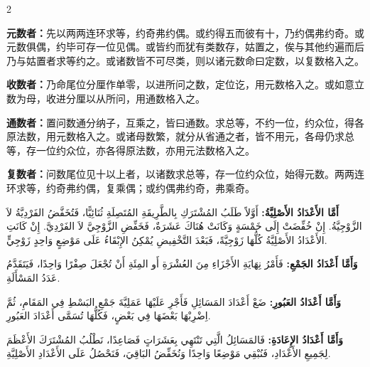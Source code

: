 \documentclass[11pt,a4paper]{article}
\newcommand{\ar}[1]{\arabicfont\beginR #1\endR}
\newcommand{\zhtext}[1]{{\chinese #1}}
\newenvironment{bilingual}{%
  \begin{paracol}{2}
}{%
  \end{paracol}
}
\begin{document}
\begin{bilingual}

\begin{leftcolumn*}
\textbf{元数者：}\zhtext{先以两两连环求等，约奇弗约偶。或约得五而彼有十，乃约偶弗约奇。或元数俱偶，约毕可存一位见偶。或皆约而犹有类数存，姑置之，俟与其他约遍而后乃与姑置者求等约之。或诸数皆不可尽类，则以诸元数命曰定数，以复数格入之。}

\textbf{收数者：}\zhtext{乃命尾位分厘作单零，以进所问之数，定位讫，用元数格入之。或如意立数为母，收进分厘以从所问，用通数格入之。}

\textbf{通数者：}\zhtext{置问数通分纳子，互乘之，皆曰通数。求总等，不约一位，约众位，得各原法数，用元数格入之。或诸母数繁，就分从省通之者，皆不用元，各母仍求总等，存一位约众位，亦各得原法数，亦用元法数格入之。}

\textbf{复数者：}\zhtext{问数尾位见十以上者，以诸数求总等，存一位约众位，始得元数。两两连环求等，约奇弗约偶，复乘偶；或约偶弗约奇，弗乘奇。}
\end{leftcolumn*}

\begin{rightcolumn*}
\ar{\textbf{أَمَّا الأَعْدَادُ الأَصْلِيَّةُ:} أَوَّلاً طَلَبُ المُشْتَرَكِ بِالطَّرِيقَةِ المُتَصِلَةِ ثُنَائِيًّا، فَتُخَفَّضُ الفَرْدِيَّةُ لاَ الزَّوْجِيَّةُ. إِنْ خُفِّضَتْ إِلَى خَمْسَةٍ وَكَانَتْ هُنَاكَ عَشَرَةٌ، فَخَفِّضِ الزَّوْجِيَّ لاَ الفَرْدِيَّ. إِنْ كَانَتِ الأَعْدَادُ الأَصْلِيَّةُ كُلُّهَا زَوْجِيَّةً، فَبَعْدَ التَّخْفِيضِ يُمْكِنُ الإِبْقَاءُ عَلَى مَوْضِعٍ وَاحِدٍ زَوْجِيٍّ.}

\ar{\textbf{وَأَمَّا أَعْدَادُ الجَمْعِ:} فَأَمْرُ نِهَايَةِ الأَجْزَاءِ مِنَ العُشْرَةِ أَو المِئَةِ أَنْ تُجْعَلَ صِفْرًا وَاحِدًا، فَيَتَقَدَّمُ عَدَدُ المَسْأَلَةِ.}

\ar{\textbf{وَأَمَّا أَعْدَادُ العَبُورِ:} ضَعْ أَعْدَادَ المَسَائِلِ فَأَجْرِ عَلَيْهَا عَمَلِيَّةَ جَمْعِ البَسْطِ فِي المَقَامِ، ثُمَّ اِضْرِبْهَا بَعْضَهَا فِي بَعْضٍ، فَكُلُّهَا تُسَمَّى أَعْدَادَ العَبُورِ.}

\ar{\textbf{وَأَمَّا أَعْدَادُ الإِعَادَةِ:} فَالمَسَائِلُ الَّتِي تَنْتَهِي بِعَشَرَاتٍ فَصَاعِدًا، نَطْلُبُ المُشْتَرَكَ الأَعْظَمَ لِجَمِيعِ الأَعْدَادِ، فَنُبْقِي مَوْضِعًا وَاحِدًا وَنُخَفِّضُ البَاقِيَ، فَنَحْصُلُ عَلَى الأَعْدَادِ الأَصْلِيَّةِ.}
\end{rightcolumn*}

\end{bilingual}

\vspace{1em}
\end{document}
